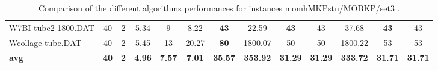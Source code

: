 \begin{table}[h]
{\begin{tabular}{lcccccccccccc}
W7BI-tube2-1800.DAT & 40 & 2 &  \textcolor{blue2}{5.34} & 9 & 8.22 &  \textbf{43} & 22.59 &  \textbf{43} & 43 & 37.68 &  \textbf{43} & 43 \\
Wcollage-tube.DAT & 40 & 2 &  \textcolor{blue2}{5.45} & 13 & 20.27 &  \textbf{80} & 1800.07 & 50 & 50 & 1800.22 & 53 & 53 \\
\cline{1-13} \textbf{avg} & \textbf{40} & \textbf{2} & \textbf{4.96} & \textbf{7.57} & \textbf{7.01} & \textbf{35.57} & \textbf{353.92} & \textbf{31.29} & \textbf{31.29} & \textbf{333.72} & \textbf{31.71} & \textbf{31.71} \\ \cline{1-13}
\bottomrule
\end{tabular}
}%
\caption{Comparison of the different algorithms performances for instances momhMKPstu/MOBKP/set3 .}
\label{tab:table_compare_momhMKPstu/MOBKP/set3 }
\end{table}
